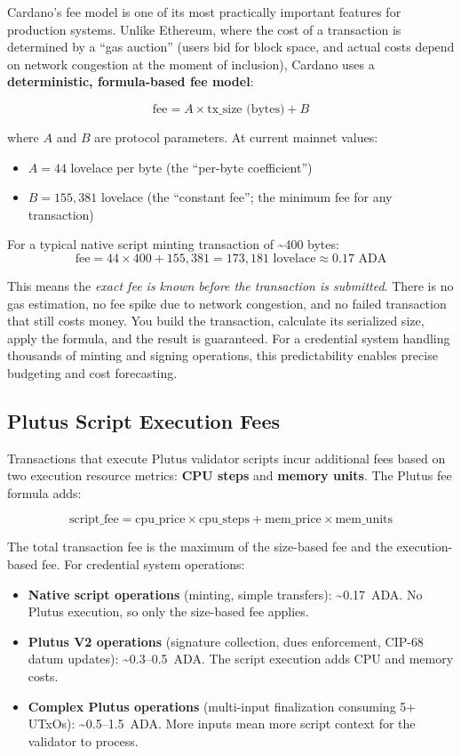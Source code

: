 Cardano's fee model is one of its most practically important features
for production systems. Unlike Ethereum, where the cost of a transaction
is determined by a ``gas auction'' (users bid for block space, and
actual costs depend on network congestion at the moment of inclusion),
Cardano uses a \textbf{deterministic, formula-based fee model}:

\[
  \text{fee} = A \times \text{tx\_size (bytes)} + B
\]

where $A$ and $B$ are protocol parameters. At current mainnet values:
\begin{itemize}[nosep]
  \item $A = 44$ lovelace per byte (the ``per-byte coefficient'')
  \item $B = 155{,}381$ lovelace (the ``constant fee''; the minimum fee
    for any transaction)
\end{itemize}

For a typical native script minting transaction of \textasciitilde400
bytes:
\[
  \text{fee} = 44 \times 400 + 155{,}381 = 173{,}181 \text{ lovelace}
  \approx 0.17 \text{ ADA}
\]

This means the \emph{exact fee is known before the transaction is
submitted}. There is no gas estimation, no fee spike due to network
congestion, and no failed transaction that still costs money. You build
the transaction, calculate its serialized size, apply the formula, and
the result is guaranteed. For a credential system handling thousands of
minting and signing operations, this predictability enables precise
budgeting and cost forecasting.

\subsection{Plutus Script Execution Fees}

Transactions that execute Plutus validator scripts incur additional fees
based on two execution resource metrics: \textbf{CPU steps} and
\textbf{memory units}. The Plutus fee formula adds:

\[
  \text{script\_fee} = \text{cpu\_price} \times \text{cpu\_steps}
    + \text{mem\_price} \times \text{mem\_units}
\]

The total transaction fee is the maximum of the size-based fee and the
execution-based fee. For credential system operations:

\begin{itemize}[nosep]
  \item \textbf{Native script operations} (minting, simple transfers):
    \textasciitilde0.17~ADA. No Plutus execution, so only the size-based
    fee applies.
  \item \textbf{Plutus V2 operations} (signature collection, dues
    enforcement, CIP-68 datum updates): \textasciitilde0.3--0.5~ADA.
    The script execution adds CPU and memory costs.
  \item \textbf{Complex Plutus operations} (multi-input finalization
    consuming 5+ UTxOs): \textasciitilde0.5--1.5~ADA. More inputs mean
    more script context for the validator to process.
\end{itemize}

